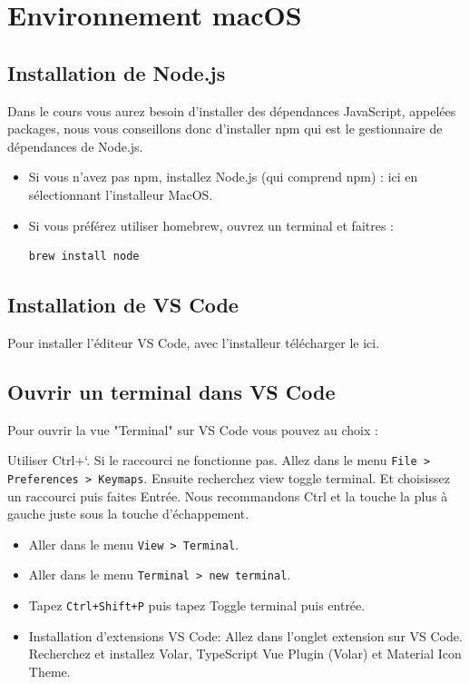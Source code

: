 
\section{Environnement macOS}
\subsection{Installation de {\color{monOrange}Node.js}}
Dans le cours vous aurez besoin d'installer des dépendances {\color{monOrange}JavaScript}, appelées {\color{monOrange}packages}, nous vous conseillons donc d'installer {\color{monOrange}npm} qui est le gestionnaire de dépendances de {\color{monOrange}Node.js}.
\begin{itemize}
\item Si vous n'avez pas npm, installez Node.js (qui comprend npm) : ici en sélectionnant l'installeur MacOS.
\item Si vous préférez utiliser homebrew, ouvrez un terminal et faitres :
\begin{verbatim}
brew install node
\end{verbatim}

\end{itemize}
\subsection{Installation de VS Code}
Pour installer l'éditeur {\color{monOrange}VS Code}, avec l'installeur télécharger le ici.

\subsection{Ouvrir un terminal dans {\color{monOrange}VS Code}}
Pour ouvrir la vue "Terminal" sur VS Code vous pouvez au choix :

Utiliser {\color{monOrange}Ctrl+`}. Si le raccourci ne fonctionne pas. Allez dans le menu {\tt File > Preferences > Keymaps}. Ensuite recherchez view toggle terminal. Et choisissez un raccourci puis faites Entrée. Nous recommandons Ctrl et la touche la plus à gauche juste sous la touche d'échappement.
\begin{itemize}
\item Aller dans le menu {\tt View > Terminal}.

\item Aller dans le menu {\tt Terminal > new terminal}.

\item Tapez {\tt Ctrl+Shift+P} puis tapez Toggle terminal puis entrée.
\item Installation d'extensions {\color{monOrange}VS Code}: Allez dans l'onglet extension sur {\color{monOrange}VS Code}. Recherchez et installez {\color{monOrange}Volar, TypeScript Vue Plugin (Volar)} et {\color{monOrange}Material Icon Theme}.
\end{itemize}




